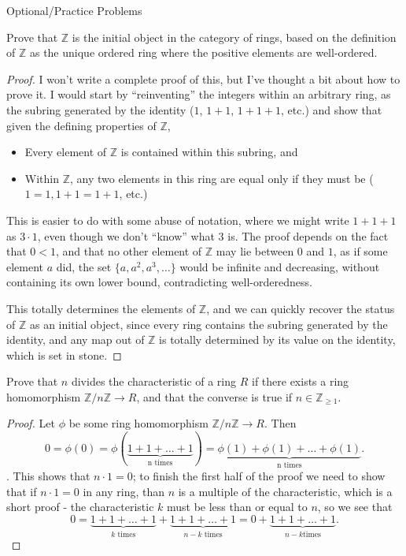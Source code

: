 \documentclass[12pt]{article}
\newcommand{\Z}{\mathbb{Z}}
\theoremstyle{definition}
\newenvironment{problem}[2][Problem]{\begin{trivlist}
\item[\hskip \labelsep {\bfseries #1}\hskip \labelsep {\bfseries #2.}]}{\end{trivlist}}
\begin{document}
\begin{section}{Optional/Practice Problems}
	\begin{problem}{1}
		Prove that $\Z$ is the initial object in the category of rings, based on the definition of $\Z$ as the unique ordered ring where the positive elements are well-ordered.
	\end{problem}
	\begin{proof}
		I won't write a complete proof of this, but I've thought a bit about how to prove it. I would start by ``reinventing'' the integers within an arbitrary ring, as the subring generated by the identity ($1$, $1 + 1$, $1 + 1 + 1$, etc.) and show that given the defining properties of $\Z$,
		\begin{itemize}
			\item Every element of $\Z$ is contained within this subring, and
			\item Within $\Z$, any two elements in this ring are equal only if they must be ($1 = 1, 1 + 1 = 1 + 1$, etc.)
		\end{itemize}
		This is easier to do with some abuse of notation, where we might write $1 + 1 + 1$ as $3 \cdot 1$, even though we don't ``know'' what $3$ is. The proof depends on the fact that $0 < 1$, and that no other element of $\Z$ may lie between $0 $ and $1$, as if some element $a$ did, the set $\{a, a^2, a^3, \dots\}$ would be infinite and decreasing, without containing its own lower bound, contradicting well-orderedness.
		\par This totally determines the elements of $\Z$, and we can quickly recover the status of $\Z$ as an initial object, since every ring contains the subring generated by the identity, and any map out of $\Z$ is totally determined by its value on the identity, which is set in stone. 
	\end{proof}
	\begin{problem}{2a}
		Prove that $n$ divides the characteristic of a ring $R$ if there exists a ring homomorphism $\Z/n\Z \to R$, and that the converse is true if $n \in \Z_{\geq 1}$.
	\end{problem}
	\begin{proof}
		Let $\phi$ be some ring homomorphism $\Z/n\Z \to R$. Then \[ 0 = \phi(0) = \phi(\underbrace{1 + 1 + \dots + 1}_{\text{n times}}) = \underbrace{\phi(1) + \phi(1) + \dots + \phi(1)}_{\text{n times}}.\]. This shows that $n \cdot 1 = 0$; to finish the first half of the proof we need to show that if $n \cdot 1 = 0$ in any ring, than $n$ is a multiple of the characteristic, which is a short proof - the characteristic $k$ must be less than or equal to $n$, so we see that \[0 = \underbrace{1 + 1 + \dots + 1}_{k\text{ times}} + \underbrace{1 + 1 + \dots + 1}_{n - k\text{ times}} = 0 + \underbrace{1 + 1 + \dots + 1}_{n - k \text{times}}.\]

\end{proof}
\end{section}
\end{document}
